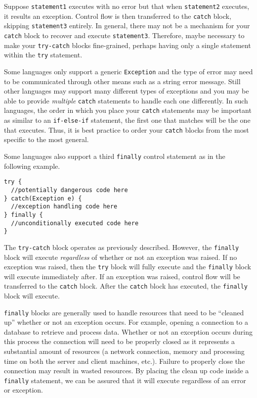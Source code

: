 Suppose \texttt{statement1} executes with no error but
that when \texttt{statement2} executes, it results an
exception.  Control flow is then transferred to the \texttt{catch}
block, skipping \texttt{statement3} entirely.  In 
general, there may not be a mechanism for your \texttt{catch}
block to recover and execute \texttt{statement3}.
Therefore, maybe necessary to make your \texttt{try-catch}
blocks fine-grained, perhaps having only a single statement within
the \texttt{try} statement.

Some languages only support a generic \texttt{Exception} and
the type of error may need to be communicated through other means 
such as a string error message.  Still other languages may support
many different types of exceptions and you may be able to provide
\emph{multiple} \texttt{catch} statements to handle each
one differently.  In such languages, the order in which you place
your \texttt{catch} statements may be important as similar
to an \texttt{if-else-if} statement, the first one that matches
will be the one that executes.  Thus, it is best practice to order
your \texttt{catch} blocks from the most specific to the
most general. 

Some languages also support a third \texttt{finally} control
statement as in the following example.

\begin{verbatim}
try {
  //potentially dangerous code here  
} catch(Exception e) {
  //exception handling code here
} finally {
  //unconditionally executed code here
}
\end{verbatim}

The \texttt{try-catch} block operates as previously 
described.  However, the \texttt{finally} block will
execute \emph{regardless} of whether or not an exception
was raised.  If no exception was raised, then the \texttt{try}
block will fully execute and the \texttt{finally} block
will execute immediately after.  If an exception was raised, 
control flow will be transferred to the \texttt{catch}
block.  After the \texttt{catch} block has executed, the
\texttt{finally} block will execute.

\texttt{finally} blocks are generally used to handle
resources that need to be ``cleaned up'' whether or not an
exception occurs.  For example, opening a connection to a
database to retrieve and process data.  Whether or not
an exception occurs during this process the connection will
need to be properly closed as it represents a substantial 
amount of resources (a network connection, memory and
processing time on both the server and client machines, 
etc.).  Failure to properly close the connection may result
in wasted resources.  By placing the clean up code inside
a \texttt{finally} statement, we can be assured that
it will execute regardless of an error or exception.

